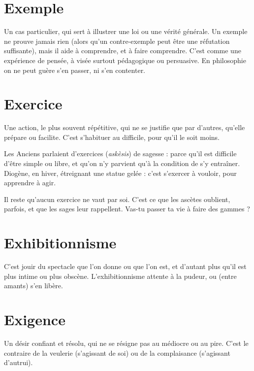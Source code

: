 \section{Exemple}
Un cas particulier, qui sert à illustrer une loi ou une vérité générale.
Un exemple ne prouve jamais rien (alors qu’un contre-exemple
peut être une réfutation suffisante), mais il aide à comprendre, et à
faire comprendre. C’est comme une expérience de pensée, à visée surtout pédagogique
ou persuasive. En philosophie on ne peut guère s’en passer, ni s’en
contenter.

\section{Exercice}
Une action, le plus souvent répétitive, qui ne se justifie que par
d’autres, qu’elle prépare ou facilite. C’est s’habituer au difficile,
pour qu’il le soit moins.

Les Anciens parlaient d’exercices ({\it askèsis}) de sagesse : parce qu’il est difficile
d’être simple ou libre, et qu’on n’y parvient qu’à la condition de s’y entraîner.
Diogène, en hiver, étreignant une statue gelée : c’est s’exercer à vouloir, pour
apprendre à agir.

Il reste qu'aucun exercice ne vaut par soi. C’est ce que les ascètes
oublient, parfois, et que les sages leur rappellent. Vas-tu passer ta vie à faire
des gammes ?

\section{Exhibitionnisme}
C'est jouir du spectacle que l’on donne ou que l’on
est, et d'autant plus qu’il est plus intime ou plus obscène.
L’exhibitionnisme attente à la pudeur, ou (entre amants) s’en libère.

\section{Exigence}
Un désir confiant et résolu, qui ne se résigne pas au médiocre
ou au pire. C’est le contraire de la veulerie (s'agissant de soi) ou
de la complaisance (s’agissant d’autrui).

